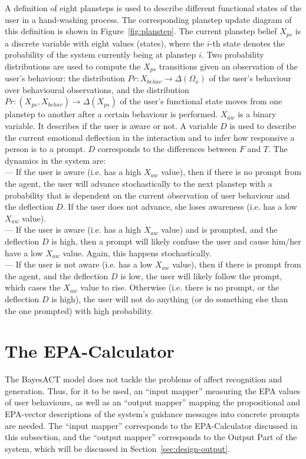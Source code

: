 A definition of eight plansteps is used to describe different functional states of the user in a hand-washing process. The corresponding planstep update diagram of this definition is shown in Figure~\ref{fig:planstep}. The current planstep belief $X_{ps}$ is a discrete variable with eight values (states), where the $i$-th state denotes the probability of the system currently being at planstep $i$. Two probability distributions are used to compute the $X_{ps}$ transitions given an observation of the user's behaviour: the distribution $Pr: X_{behav} \to \Delta(\Omega_{x})$ of the user's behaviour over behavioural observations, and the distribution $Pr: (X_{ps}, X_{behav}) \to \Delta(X_{ps})$ of the user's functional state moves from one planstep to another after a certain behaviour is performed. $X_{aw}$ is a binary variable. It describes if the user is aware or not. A variable $D$ is used to describe the current emotional deflection in the interaction and to infer how responsive a person is to a prompt. $D$ corresponds to the differences between $F$ and $T$. The dynamics in the system are: \\
--- If the user is aware (i.e. has a high $X_{aw}$ value), then if there is no prompt from the agent, the user will advance stochastically to the next planstep with a probability that is dependent on the current observation of user behaviour and the deflection $D$. If the user does not advance, she loses awareness (i.e. has a low $X_{aw}$ value). \\
--- If the user is aware (i.e. has a high $X_{aw}$ value) and is prompted, and the deflection $D$ is high, then a prompt will likely confuse the user and cause him/her have a low $X_{aw}$ value. Again, this happens stochastically. \\
--- If the user is not aware (i.e. has a low $X_{aw}$ value), then if there is prompt from the agent, and the deflection $D$ is low, the user will likely follow the prompt, which cases the $X_{aw}$ value to rise. Otherwise (i.e. there is no prompt, or the deflection $D$ is high), the user will not do anything (or do something else than the one prompted) with high probability.


\section{The EPA-Calculator}
\label{sec:design-epacalc}

The BayesACT model does not tackle the problems of affect recognition and generation. Thus, for it to be used, an ``input mapper'' measuring the EPA values of user behaviours, as well as an ``output mapper'' mapping the propositional and EPA-vector descriptions of the system's guidance messages into concrete prompts are needed. The ``input mapper'' corresponds to the EPA-Calculator discussed in this subsection, and the ``output mapper'' corresponds to the Output Part of the system, which will be discussed in Section~\ref{sec:design-output}.

